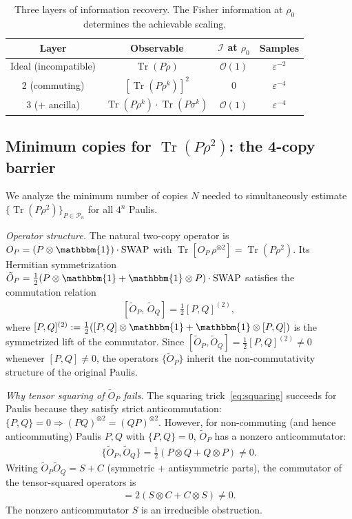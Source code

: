 \documentclass[aps,%
twocolumn,%
floatfix,%
pra,%
amsfonts,%
groupedaddress,%
superscriptaddress]{revtex4-2}%
\DeclareMathOperator{\tr}{Tr}
\newcommand{\ox}{\otimes}
\newcommand{\1}{\mathbbm{1}}
\newcommand*{\cP}{\mathcal{P}}
\newcommand*{\cI}{\mathcal{I}}
\begin{document}
\begin{table}[h]
\centering
\begin{tabular}{c|c|c|c}
\textbf{Layer} & \textbf{Observable} & $\cI$ \textbf{at} $\rho_0$ & \textbf{Samples} \\ \hline
Ideal (incompatible) & $\tr(P\rho)$ & $\mathcal{O}(1)$ & $\varepsilon^{-2}$ \\
2 (commuting) & $[\tr(P\rho^k)]^2$ & $0$ & $\varepsilon^{-4}$ \\
3 (+ ancilla) & $\tr(P\rho^k)\cdot\tr(P\sigma^k)$ & $\mathcal{O}(1)$ & $\varepsilon^{-4}$
\end{tabular}
\caption{Three layers of information recovery. The Fisher information at $\rho_0$ determines the achievable scaling.}
\label{tab:three_levels_recovery}
\end{table}


\subsection{Minimum copies for $\tr(P\rho^2)$: the 4-copy barrier}\label{app:min_copies}

We analyze the minimum number of copies $N$ needed to simultaneously estimate $\{\tr(P\rho^2)\}_{P\in\cP_n}$ for all $4^n$ Paulis.

\emph{Operator structure.}
The natural two-copy operator is $O_P = (P \ox \1) \cdot \mathrm{SWAP}$ with $\tr[O_P\,\rho^{\ox 2}] = \tr(P\rho^2)$. Its Hermitian symmetrization $\tilde{O}_P = \frac{1}{2}(P\ox\1 + \1\ox P)\cdot\mathrm{SWAP}$ satisfies the commutation relation
\begin{align}\label{eq:tilde-commutator}
[\tilde{O}_P,\, \tilde{O}_Q] = \tfrac{1}{2}[P,Q]^{(2)},
\end{align}
\color{red}where $[P,Q]^{(2)} := \tfrac{1}{2}([P,Q]\ox\1 + \1\ox [P,Q])$ is the symmetrized lift of the commutator. Since $[\tilde{O}_P,\tilde{O}_Q] = \tfrac{1}{2}[P,Q]^{(2)} \neq 0$ whenever $[P,Q]\neq 0$, the operators $\{\tilde{O}_P\}$ inherit the non-commutativity structure of the original Paulis.\color{black}

\emph{Why tensor squaring of $\tilde{O}_P$ fails.}
The squaring trick~\eqref{eq:squaring} succeeds for Paulis because they satisfy strict anticommutation: $\{P,Q\} = 0 \Rightarrow (PQ)^{\ox 2} = (QP)^{\ox 2}$. However, \color{red}for non-commuting (and hence anticommuting) Paulis $P,Q$ with $\{P,Q\}=0$,\color{black} $\tilde{O}_P$ has a nonzero anticommutator:
\begin{align}
\{\tilde{O}_P, \tilde{O}_Q\} = \tfrac{1}{2}(P\ox Q + Q\ox P) \neq 0.
\end{align}
Writing $\tilde{O}_P\tilde{O}_Q = S + C$ (symmetric + antisymmetric parts), the commutator of the tensor-squared operators is
\begin{align}
[\tilde{O}_P\ox\tilde{O}_P,\; \tilde{O}_Q\ox\tilde{O}_Q] = 2(S\ox C + C\ox S) \neq 0.
\end{align}
The nonzero anticommutator $S$ is an irreducible obstruction.
\end{document}
